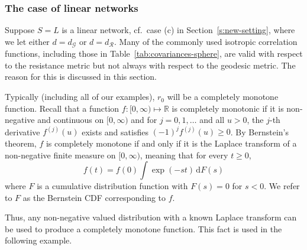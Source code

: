 \documentclass[alpha-refs]{wiley-article}
\begin{document}
\subsubsection{The case of linear networks}\label{s:L-cov}

Suppose $S=L$ is a linear network, cf.\ case (c) in Section~\ref{s:new-setting}, where we let either $d=d_{\mathcal G}$ or $d=d_{\mathcal R}$.  
Many of the commonly used isotropic correlation functions, including those in Table~\ref{tab:covariances-sphere}, 
are valid with respect to the resistance metric but not always with respect to the geodesic metric. The reason for this is discussed 
in this section.  

Typically (including all of our examples), $r_0$ will %
 be a completely monotone function. Recall that 
a function $f : [0,\infty)\mapsto\mathbb R$ is completely monotonic if it is non-negative and continuous on $[0,\infty)$ and for $j=0,1,\ldots$ and all $u>0$, the $j$-th derivative $f^{(j)}(u)$ exists and satisfies $(-1)^jf^{(j)}(u)\ge0$. By Bernstein's theorem, $f$ is completely monotone if and only if it is the Laplace transform of a non-negative finite measure on $[0,\infty)$, meaning that for every $t\ge0$,
\begin{equation}\label{e:bernstein}
f(t)=f(0)\int\exp(-st)\,\mathrm dF(s)
\end{equation}
where $F$ is a cumulative distribution function with $F(s)=0$ for $s<0$. We refer to $F$ as the Bernstein CDF corresponding to $f$. 

Thus, any non-negative valued distribution with a known Laplace transform can be used to produce a completely monotone function. This fact is used in the following example. 
\end{document}
